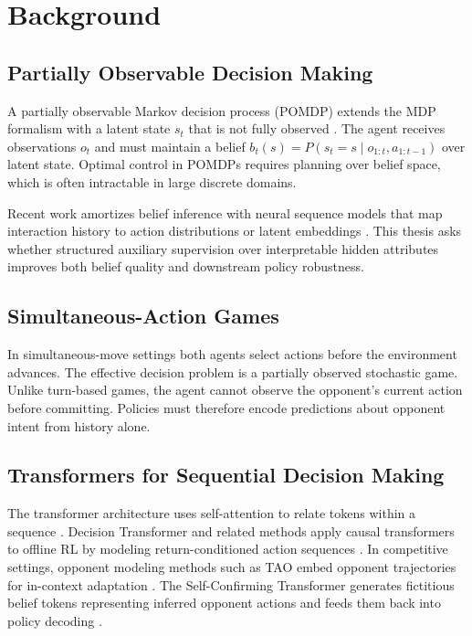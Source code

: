 \chapter{Background}
\label{ch:background}

\section{Partially Observable Decision Making}

A partially observable Markov decision process (POMDP) extends the MDP
formalism with a latent state $s_t$ that is not fully observed
\citep{kaelbling1998planning}. The agent receives observations $o_t$ and must
maintain a belief $b_t(s) = P(s_t = s \mid o_{1:t}, a_{1:t-1})$ over latent
state. Optimal control in POMDPs requires planning over belief space, which is
often intractable in large discrete domains.

Recent work amortizes belief inference with neural sequence models that map
interaction history to action distributions or latent embeddings
\citep{chen2021decision,liu2024tao}. This thesis asks whether
structured auxiliary supervision over interpretable hidden attributes improves
both belief quality and downstream policy robustness.

\section{Simultaneous-Action Games}

In simultaneous-move settings both agents select actions before the environment
advances. The effective decision problem is a partially observed stochastic game.
Unlike turn-based games, the agent cannot observe the opponent's current action
before committing. Policies must therefore encode predictions about opponent
intent from history alone.

\section{Transformers for Sequential Decision Making}

The transformer architecture uses self-attention to relate tokens within a
sequence \citep{vaswani2017attention}. Decision Transformer and related methods apply causal transformers to offline RL by modeling return-conditioned action
sequences \citep{chen2021decision}. In competitive settings, opponent modeling
methods such as TAO embed opponent trajectories for in-context adaptation
\citep{liu2024tao}. The Self-Confirming Transformer generates fictitious belief
tokens representing inferred opponent actions and feeds them back into policy
decoding \citep{zhang2024sct}.

